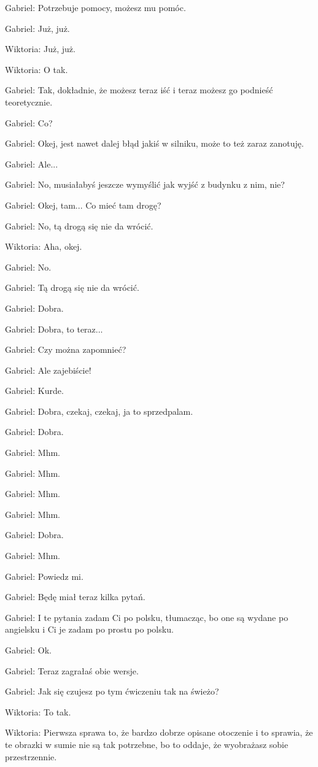 Gabriel: Potrzebuje pomocy, możesz mu pomóc.

Gabriel: Już, już.

Wiktoria: Już, już.

Wiktoria: O tak.

Gabriel: Tak, dokładnie, że możesz teraz iść i teraz możesz go podnieść teoretycznie.

Gabriel: Co?

Gabriel: Okej, jest nawet dalej błąd jakiś w silniku, może to też zaraz zanotuję.

Gabriel: Ale...

Gabriel: No, musiałabyś jeszcze wymyślić jak wyjść z budynku z nim, nie?

Gabriel: Okej, tam... Co mieć tam drogę?

Gabriel: No, tą drogą się nie da wrócić.

Wiktoria: Aha, okej.

Gabriel: No.

Gabriel: Tą drogą się nie da wrócić.

Gabriel: Dobra.

Gabriel: Dobra, to teraz...

Gabriel: Czy można zapomnieć?

Gabriel: Ale zajebiście!

Gabriel: Kurde.

Gabriel: Dobra, czekaj, czekaj, ja to sprzedpalam.

Gabriel: Dobra.

Gabriel: Mhm.

Gabriel: Mhm.

Gabriel: Mhm.

Gabriel: Mhm.

Gabriel: Dobra.

Gabriel: Mhm.

Gabriel: Powiedz mi.

Gabriel: Będę miał teraz kilka pytań.

Gabriel: I te pytania zadam Ci po polsku, tłumacząc, bo one są wydane po angielsku i Ci je zadam po prostu po polsku.

Gabriel: Ok.

Gabriel: Teraz zagrałaś obie wersje.

Gabriel: Jak się czujesz po tym ćwiczeniu tak na świeżo?

Wiktoria: To tak.

Wiktoria: Pierwsza sprawa to, że bardzo dobrze opisane otoczenie i to sprawia, że te obrazki w sumie nie są tak potrzebne, bo to oddaje, że wyobrażasz sobie przestrzennie.

